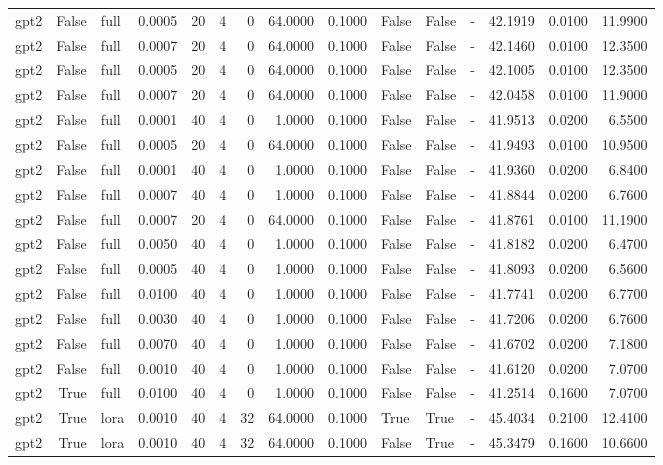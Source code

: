 \begin{tabular}{lrlrrrrrrlllrrr}
gpt2 & False & full & 0.0005 & 20 & 4 & 0 & 64.0000 & 0.1000 & False & False & - & 42.1919 & 0.0100 & 11.9900 \\
gpt2 & False & full & 0.0007 & 20 & 4 & 0 & 64.0000 & 0.1000 & False & False & - & 42.1460 & 0.0100 & 12.3500 \\
gpt2 & False & full & 0.0005 & 20 & 4 & 0 & 64.0000 & 0.1000 & False & False & - & 42.1005 & 0.0100 & 12.3500 \\
gpt2 & False & full & 0.0007 & 20 & 4 & 0 & 64.0000 & 0.1000 & False & False & - & 42.0458 & 0.0100 & 11.9000 \\
gpt2 & False & full & 0.0001 & 40 & 4 & 0 & 1.0000 & 0.1000 & False & False & - & 41.9513 & 0.0200 & 6.5500 \\
gpt2 & False & full & 0.0005 & 20 & 4 & 0 & 64.0000 & 0.1000 & False & False & - & 41.9493 & 0.0100 & 10.9500 \\
gpt2 & False & full & 0.0001 & 40 & 4 & 0 & 1.0000 & 0.1000 & False & False & - & 41.9360 & 0.0200 & 6.8400 \\
gpt2 & False & full & 0.0007 & 40 & 4 & 0 & 1.0000 & 0.1000 & False & False & - & 41.8844 & 0.0200 & 6.7600 \\
gpt2 & False & full & 0.0007 & 20 & 4 & 0 & 64.0000 & 0.1000 & False & False & - & 41.8761 & 0.0100 & 11.1900 \\
gpt2 & False & full & 0.0050 & 40 & 4 & 0 & 1.0000 & 0.1000 & False & False & - & 41.8182 & 0.0200 & 6.4700 \\
gpt2 & False & full & 0.0005 & 40 & 4 & 0 & 1.0000 & 0.1000 & False & False & - & 41.8093 & 0.0200 & 6.5600 \\
gpt2 & False & full & 0.0100 & 40 & 4 & 0 & 1.0000 & 0.1000 & False & False & - & 41.7741 & 0.0200 & 6.7700 \\
gpt2 & False & full & 0.0030 & 40 & 4 & 0 & 1.0000 & 0.1000 & False & False & - & 41.7206 & 0.0200 & 6.7600 \\
gpt2 & False & full & 0.0070 & 40 & 4 & 0 & 1.0000 & 0.1000 & False & False & - & 41.6702 & 0.0200 & 7.1800 \\
gpt2 & False & full & 0.0010 & 40 & 4 & 0 & 1.0000 & 0.1000 & False & False & - & 41.6120 & 0.0200 & 7.0700 \\
gpt2 & True & full & 0.0100 & 40 & 4 & 0 & 1.0000 & 0.1000 & False & False & - & 41.2514 & 0.1600 & 7.0700 \\
gpt2 & True & lora & 0.0010 & 40 & 4 & 32 & 64.0000 & 0.1000 & True & True & - & 45.4034 & 0.2100 & 12.4100 \\
gpt2 & True & lora & 0.0010 & 40 & 4 & 32 & 64.0000 & 0.1000 & False & True & - & 45.3479 & 0.1600 & 10.6600 \\

\end{tabular}
